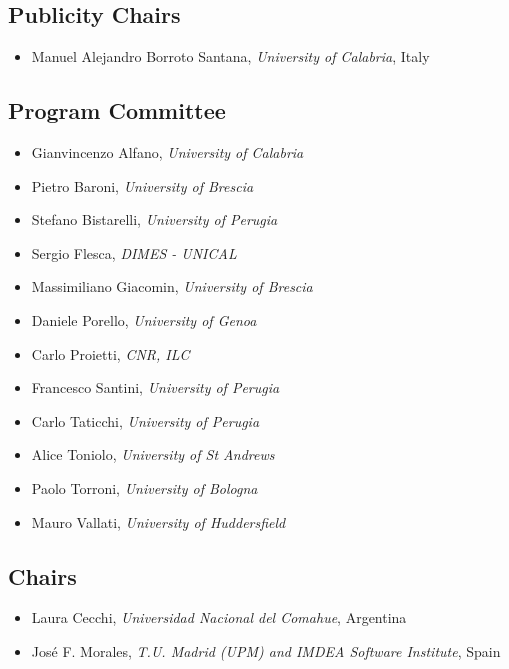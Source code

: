 \documentclass[
]{ceurart}
\begin{document}
\subsection*{Publicity Chairs}
\begin{itemize}
  \item Manuel Alejandro Borroto Santana, \emph{University of Calabria}, Italy
\end{itemize}


\subsection*{Program Committee}
\begin{itemize}
  \item Gianvincenzo Alfano, \emph{University of Calabria}
  \item Pietro Baroni, \emph{University of Brescia}
  \item Stefano Bistarelli, \emph{University of Perugia}
  \item Sergio Flesca, \emph{DIMES - UNICAL}
  \item Massimiliano Giacomin, \emph{University of Brescia}
  \item Daniele Porello, \emph{University of Genoa}
  \item Carlo Proietti, \emph{CNR, ILC}
  \item Francesco Santini, \emph{University of Perugia}
  \item Carlo Taticchi, \emph{University of Perugia}
  \item Alice Toniolo, \emph{University of St Andrews}
  \item Paolo Torroni, \emph{University of Bologna}
  \item Mauro Vallati, \emph{University of Huddersfield}
\end{itemize}


\subsection*{Chairs}
\begin{itemize}
  \item Laura Cecchi, \emph{Universidad Nacional del Comahue}, Argentina
  \item José F. Morales, \emph{T.U. Madrid (UPM) and IMDEA Software Institute}, Spain
\end{itemize}

\end{document}
